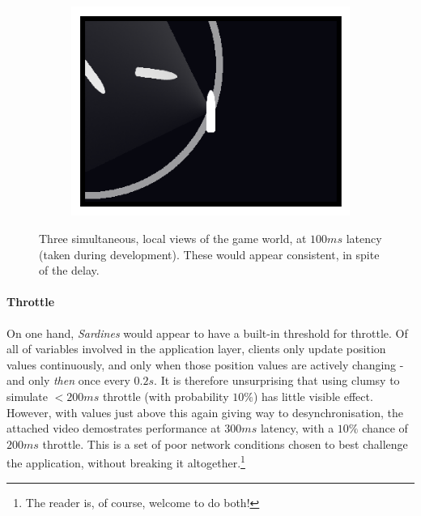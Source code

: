 \documentclass[a4paper, 9pt]{article}
\begin{document}
\begin{flushleft}
\begin{figure}[h]
\begin{subfigure}[b]{0.3\textwidth}
\includegraphics[width=\textwidth]{100ms Latency (1)}
\end{subfigure}
\caption{Three simultaneous, local views of the game world, at $100ms$ latency (taken during development). These would appear consistent, in spite of the delay.}
\label{Lag Testing}
\end{figure}

\paragraph{Throttle} On one hand, \textit{Sardines} would appear to have a built-in threshold for throttle. Of all of variables involved in the application layer, clients only update position values continuously, and only when those position values are actively changing - and only \textit{then} once every $0.2s$. It is therefore unsurprising that using clumsy to simulate $<200ms$ throttle (with probability $10\%$) has little visible effect. However, with values just above this again giving way to desynchronisation, the attached video demostrates performance at $300ms$ latency, with a $10\%$ chance of $200ms$ throttle. This is a set of poor network conditions chosen to best challenge the application, without breaking it altogether.\footnote{The reader is, of course, welcome to do both!}%




\end{flushleft}
\end{document}
